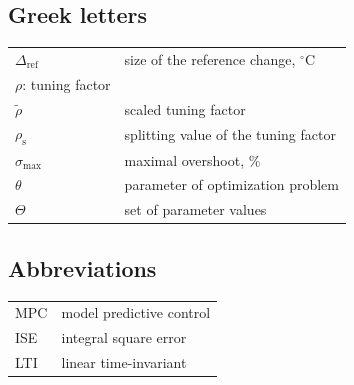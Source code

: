 \documentclass[preprint,12pt]{elsarticle}
\begin{document}
\subsection{Greek letters}
\begin{center}
	\begin{tabular}{ l l }
		$\Delta_\mathrm{ref}$ & size of the reference change, $^{\circ}\mathrm{C}$ \\
		$\rho$:	tuning factor \\
		$\widetilde{\rho}$ & scaled tuning factor \\
		$\rho_{\mathrm{s}}$ & splitting value of the tuning factor \\
		$\sigma_{\max}$ & maximal overshoot, \% \\
		$\theta$ & parameter of optimization problem \\
		$\Theta$ & set of parameter values
	\end{tabular}
\end{center}

\subsection*{Abbreviations}
\begin{center}
	\begin{tabular}{ l l }
		MPC & model predictive control \\
		ISE & integral square error \\
		LTI & linear time-invariant \\
	\end{tabular}
\end{center}




 



%
%
%
\end{document}
